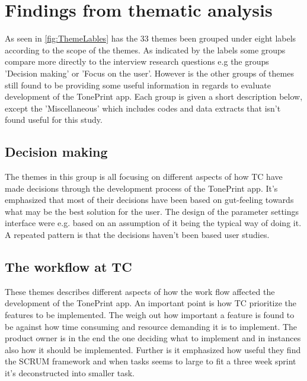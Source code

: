 \section{Findings from thematic analysis}
\label{ThematicFindings}
%
As seen in \autoref{fig:ThemeLables} has the 33 themes been grouped under eight labels according to the scope of the themes. As indicated by the labels some groups compare more directly to the interview research questions e.g the groups 'Decision making' or 'Focus on the user'. However is the other groups of themes still found to be providing some useful information in regards to evaluate development of the TonePrint app. Each group is given a short description below, except the 'Miscellaneous' which includes codes and data extracts that isn't found useful for this study.\\
\subsection*{Decision making}
The themes in this group is all focusing on different aspects of how TC have made decisions through the development process of the TonePrint app. It's emphasized that most of their decisions have been based on gut-feeling towards what may be the best solution for the user. The design of the parameter settings interface were e.g. based on an assumption of it being the typical way of doing it. A repeated pattern is that the decisions haven't been based user studies. 

\subsection*{The workflow at TC}
These themes describes different aspects of how the work flow affected the development of the TonePrint app. An important point is how TC prioritize the features to be implemented. The weigh out how important a feature is found to be against how time consuming and resource demanding it is to implement. The product owner is in the end the one deciding what to implement and in instances also how it should be implemented. Further is it emphasized how useful they find the SCRUM framework and when tasks seems to large to fit a three week sprint it's deconstructed into smaller task.  

